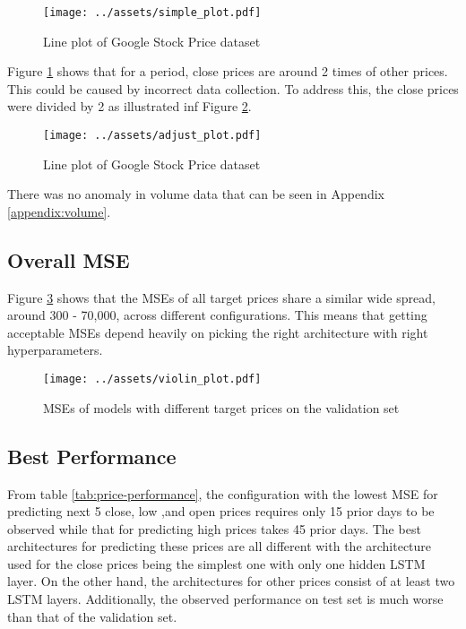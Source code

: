\documentclass[10pt,twocolumn,letterpaper]{article}
\begin{document}
\begin{figure}[!ht]
  \centering
  \texttt{[image: ../assets/simple\_plot.pdf]}
  \caption{Line plot of Google Stock Price dataset}
  \label{fig:simple-plot}
\end{figure}
Figure \ref{fig:simple-plot} shows that for a period, close prices are around 2 times of other prices. This
could be caused by incorrect data collection. To address this, the close prices were divided by 2 as illustrated
inf Figure \ref{fig:adjust-plot}.
\begin{figure}[!ht]
  \centering
  \texttt{[image: ../assets/adjust\_plot.pdf]}
  \caption{Line plot of Google Stock Price dataset}
  \label{fig:adjust-plot}
\end{figure}
There was no anomaly in volume data that can be seen in Appendix \ref{appendix:volume}.



\subsection{Overall MSE}

Figure \ref{fig:overall-performance} shows that the MSEs of all target prices share a similar wide spread,
around 300 - 70,000, across different configurations. This means that getting acceptable MSEs depend heavily on
picking the right architecture with right hyperparameters.
\begin{figure}[!ht]
  \centering
  \texttt{[image: ../assets/violin\_plot.pdf]}
  \caption{MSEs of models with different target prices on the validation set}
  \label{fig:overall-performance}
\end{figure}

\subsection{Best Performance}

From table \ref{tab:price-performance}, the configuration with the lowest MSE for predicting next 5 close, low
,and open prices requires only 15 prior days to be observed while that for predicting high prices takes 45 prior
days. The best architectures for predicting these prices are all different with the architecture used for the
close prices being the simplest one with only one hidden LSTM layer. On the other hand, the architectures for
other prices consist of at least two LSTM layers. Additionally, the observed performance on test set is much
worse than that of the validation set.
\end{document}
